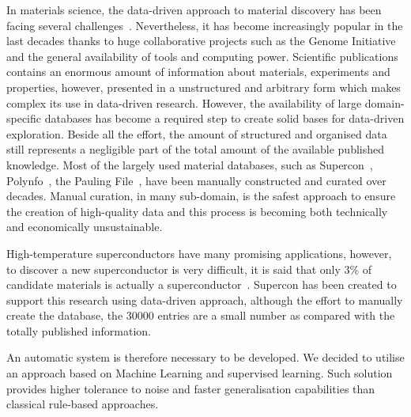 \documentclass[a4paper,10pt]{article}
\begin{document}
In materials science, the data-driven approach to material discovery has been facing several challenges~\cite{Hill2016MaterialsSW}. 
Nevertheless, it has become increasingly popular in the last decades thanks to huge collaborative projects such as the Genome Initiative~\cite{material_genome_initiative} \cite{Jain2013CommentaryTM_materialsProject} and the general availability of tools and computing power. 
Scientific publications contains an enormous amount of information about materials, experiments and properties, however, presented in a unstructured and arbitrary form which makes complex its use in data-driven research. 
However, the availability of large domain-specific databases has become a required step to create solid bases for data-driven exploration. 
Beside all the effort, the amount of structured and organised data still represents a negligible part of the total amount of the available published knowledge.
Most of the largely used material databases, such as Supercon~\cite{SuperCon}, Polynfo~\cite{polynfo}, the Pauling File~\cite{Blokhin2018ThePF_paulingFile}, have been manually constructed and curated over decades. Manual curation, in many sub-domain, is the safest approach to ensure the creation of high-quality data and this process is becoming both technically and economically unsustainable. 



High-temperature superconductors have many promising applications, however, to discover a new superconductor is very difficult, it is said that only 3\% of candidate materials is actually a superconductor~\cite{Konno2018DeepLO}.
Supercon has been created to support this research using data-driven approach, although the effort to manually create the database, the 30000 entries are a small number as compared with the totally published information.

An automatic system is therefore necessary to be developed. 
We decided to utilise an approach based on Machine Learning and supervised learning. Such solution provides higher tolerance to noise and faster generalisation capabilities than classical rule-based approaches.


\end{document}
